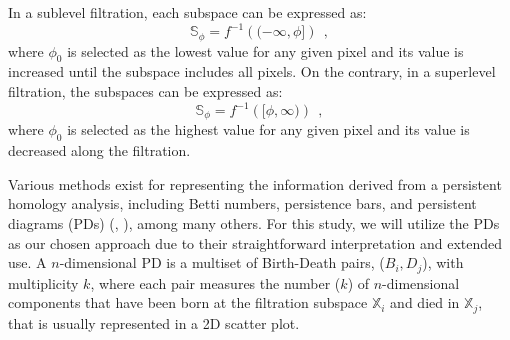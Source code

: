 In a sublevel filtration, each subspace can be expressed as:
\begin{equation}
    \mathbb{S} _ \phi = f ^{-1} \left( ( -\infty, \phi ] \right) \ \ ,
    \label{eq: sublevel}
\end{equation}
where $\phi_0$ is selected as the lowest value for any given pixel and its value is increased until the subspace includes all pixels. On the contrary, in a superlevel filtration, the subspaces can be expressed as:
\begin{equation}
    \mathbb{S} _ \phi = f ^{-1} \left( [ \phi, \infty ) \right)\ \ , 
    \label{eq : superlevel}
\end{equation}
where $\phi_0$ is selected as the highest value for any given pixel and its value is decreased along the filtration.

Various methods exist for representing the information derived from a persistent homology analysis, including Betti numbers, persistence bars, and persistent diagrams (PDs) (\citealt{pd_stability}, \citealt{pbars}), among many others. For this study, we will utilize the PDs as our chosen approach due to their straightforward interpretation and extended use. A $n$-dimensional PD is a multiset of Birth-Death pairs, ($B _ i, D _ j$), with multiplicity $k$, where each pair measures the number ($k$) of $n$-dimensional components that have been born at the filtration subspace $\mathbb{X}_i$ and died in $\mathbb{X}_j$, that is usually represented in a 2D scatter plot. 

